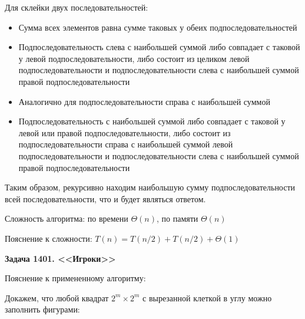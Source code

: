 \documentclass[12pt]{article}
\begin{document}
    Для склейки двух последовательностей:
    \begin{itemize}
        \item Сумма всех элементов равна сумме таковых у обеих подпоследовательностей
        \item Подпоследовательность слева с наибольшей суммой либо совпадает с таковой у левой подпоследовательности,
        либо состоит из целиком левой подпоследовательности и подпоследовательности слева с наибольшей суммой правой подпоследовательности
        \item Аналогично для подпоследовательности справа с наибольшей суммой
        \item Подпоследовательность с наибольшей суммой либо совпадает с таковой у левой или правой подпоследовательности,
        либо состоит из подпоследовательности справа с наибольшей суммой левой подпоследовательности и подпоследовательности
        слева с наибольшей суммой правой подпоследовательности
    \end{itemize}

    Таким образом, рекурсивно находим наибольшую сумму подпоследовательности всей последовательности, что и будет
    являться ответом.

    Сложность алгоритма: по времени $\Theta(n)$, по памяти $\Theta(n)$

    Пояснение к сложности: $T(n)=T(n/2)+T(n/2)+\Theta(1)$

    \bigskip
    \textbf{Задача 1401. <<Игроки>>}

    Пояснение к примененному алгоритму:

    Докажем, что любой квадрат $2^m\times 2^m$ с вырезанной клеткой в углу можно заполнить фигурами:

    \bigskip

    \begin{center}
    \end{center}
\end{document}
